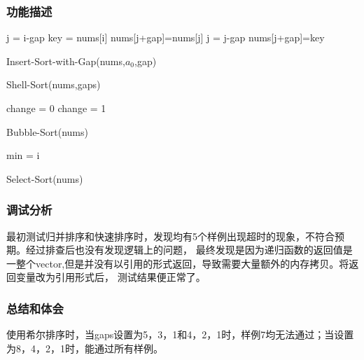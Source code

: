 \subsubsection{功能描述}
\begin{function}
    \;
    {
        j = i-gap\;
        key = nums[i]\;
        {
        nums[j+gap]=nums[j]\;
        j = j-gap\;
        }
        nums[j+gap]=key\;
    }
    \caption{Insert-Sort-with-Gap(nums,$a_0$,gap)}
\end{function}
\begin{algorithm}[H]
    {
    }
    \caption{Shell-Sort(nums,gaps)}
\end{algorithm}
\begin{algorithm}
    {
        change = 0
        {
            change = 1\;
        }
    }
    \caption{Bubble-Sort(nums)}
\end{algorithm}
\begin{algorithm}
    {
        min = i\;
        {
        }
    } 
    \caption{Select-Sort(nums)}
\end{algorithm}
\subsubsection{调试分析}
最初测试归并排序和快速排序时，发现均有5个样例出现超时的现象，不符合预期。经过排查后也没有发现逻辑上的问题，
最终发现是因为递归函数的返回值是一整个vector,但是并没有以引用的形式返回，导致需要大量额外的内存拷贝。将返回变量改为引用形式后，
测试结果便正常了。

\subsubsection{总结和体会}
使用希尔排序时，当gaps设置为5，3，1和4，2，1时，样例7均无法通过；当设置为8，4，2，1时，能通过所有样例。

